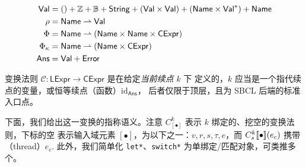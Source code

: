 \documentclass[a4paper, 11pt]{article}
\theoremstyle{remark}\newtheorem*{remark}{Remark}
\theoremstyle{definition}\newtheorem*{definition}{Definition}
\begin{document}
\begin{align*}
  \mathsf{Val} &= () + \mathbb{Z} + \mathbb{B} + \mathsf{String} + (\mathsf{Val} \times \mathsf{Val}) + (\mathsf{Name} \times \mathsf{Val}^*) + \mathsf{Name} \\
  \rho &= \mathsf{Name} \rightharpoonup \mathsf{Val} \\
  \Phi &= \mathsf{Name} \rightharpoonup (\mathsf{Name} \times \mathsf{Name} \times \mathsf{CExpr}) \\
  \Phi_\kappa &= \mathsf{Name} \rightharpoonup (\mathsf{Name} \times \mathsf{CExpr}) \\
  \mathsf{Ans} &= \mathsf{Val} + \mathsf{Error}
\end{align*}

变换法则 $\mathcal{C} :  \mathsf{LExpr} \to \mathsf{CExpr}$ 是在给定\emph{当前续点} $k$ 下
定义的，$k$ 应当是一个指代续点的变量，或恒等续点（函数）$\mathrm{id}_\mathsf{Ans}$，
后者仅限于顶层，且为 SBCL 后端的标准入口点。

下面，我们给出这一变换的指称语义。注意 $C^k_{[\bullet]}$ 表示 $k$ 绑定的、挖空的变换法则，下标的空
表示输入域元素 $[\bullet]$，为以下之一：$v, r, s, \tau, e$，而 $C^k_s\llbracket \bullet \rrbracket(e_c)$ 携带（thread）$e_c$.
此外，我们简单化 \texttt{let*}、\texttt{switch*} 为单绑定/匹配对象，可类推多个。
\end{document}
